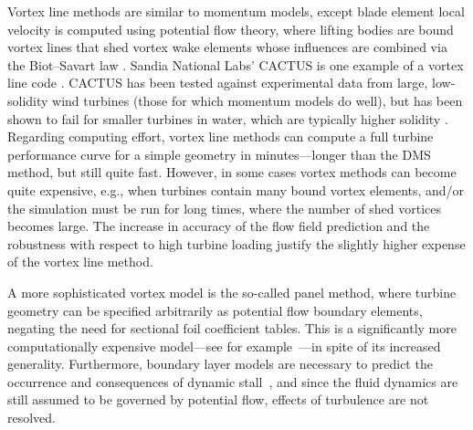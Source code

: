 Vortex line methods are similar to momentum models, except blade element local
velocity is computed using potential flow theory, where lifting bodies are bound
vortex lines that shed vortex wake elements whose influences are combined via
the Biot--Savart law \cite{Strickland1979}. Sandia National Labs' CACTUS is one
example of a vortex line code \cite{Murray2011}. CACTUS has been tested against
experimental data from large, low-solidity wind turbines (those for which
momentum models do well), but has been shown to fail for smaller turbines in
water, which are typically higher solidity \cite{Michelen2014}. Regarding
computing effort, vortex line methods can compute a full turbine performance
curve for a simple geometry in minutes---longer than the DMS method, but still
quite fast. However, in some cases vortex methods can become quite expensive,
e.g., when turbines contain many bound vortex elements, and/or the simulation
must be run for long times, where the number of shed vortices becomes large. The
increase in accuracy of the flow field prediction and the robustness with
respect to high turbine loading justify the slightly higher expense of the
vortex line method.

A more sophisticated vortex model is the so-called panel method, where turbine
geometry can be specified arbitrarily as potential flow boundary elements,
negating the need for sectional foil coefficient tables. This is a significantly
more computationally expensive model---see for example~\cite{Dixon2008}---in
spite of its increased generality. Furthermore, boundary layer models are
necessary to predict the occurrence and consequences of dynamic
stall~\cite{Zanon2012}, and since the fluid dynamics are still assumed to be
governed by potential flow, effects of turbulence are not resolved.

